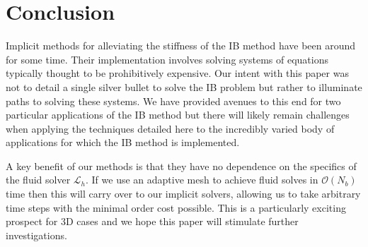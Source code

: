 \documentclass[preprint,12pt]{elsarticle}
\begin{document}
\section{Conclusion}
Implicit methods for alleviating the stiffness of the IB method have been around for some time. Their implementation involves solving systems of equations typically thought to be prohibitively expensive. Our intent with this paper was not to detail a single silver bullet to solve the IB problem but rather to illuminate paths to solving these systems. We have provided avenues to this end for two particular applications of the IB method but there will likely remain challenges when applying the techniques detailed here to the incredibly varied body of applications for which the IB method is implemented.

A key benefit of our methods is that they have no dependence on the specifics of the fluid solver $\mathcal{L}_h$. If we use an adaptive mesh to achieve fluid solves in $\mathcal{O}(N_b)$ time then this will carry over to our implicit solvers, allowing us to take arbitrary time steps with the minimal order cost possible. This is a particularly exciting prospect for 3D cases and we hope this paper will stimulate further investigations.










\end{document}
